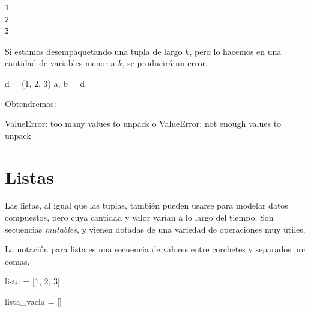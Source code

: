 \documentclass[
  letterpaper,
  DIV=11,
  numbers=noendperiod]{scrreprt}
\newenvironment{Shaded}{\begin{snugshade}}{\end{snugshade}}
\newcommand{\DecValTok}[1]{\textcolor[rgb]{0.68,0.00,0.00}{#1}}
\newcommand{\NormalTok}[1]{\textcolor[rgb]{0.00,0.23,0.31}{#1}}
\newcommand{\OperatorTok}[1]{\textcolor[rgb]{0.37,0.37,0.37}{#1}}
\begin{document}
\begin{verbatim}
1
2
3
\end{verbatim}

\begin{tcolorbox}[enhanced jigsaw, opacitybacktitle=0.6, toptitle=1mm, toprule=.15mm, arc=.35mm, breakable, bottomrule=.15mm, opacityback=0, leftrule=.75mm, rightrule=.15mm, title=\textcolor{quarto-callout-warning-color}{\faExclamationTriangle}\hspace{0.5em}{¡Cuidado!}, left=2mm, bottomtitle=1mm, colframe=quarto-callout-warning-color-frame, colback=white, titlerule=0mm, coltitle=black, colbacktitle=quarto-callout-warning-color!10!white]

Si estamos desempaquetando una tupla de largo \(k\), pero lo hacemos en
una cantidad de variables menor a \(k\), se producirá un error.

\begin{Shaded}
\begin{Highlighting}[]
\NormalTok{d }\OperatorTok{=}\NormalTok{ (}\DecValTok{1}\NormalTok{, }\DecValTok{2}\NormalTok{, }\DecValTok{3}\NormalTok{)}
\NormalTok{a, b }\OperatorTok{=}\NormalTok{ d}
\end{Highlighting}
\end{Shaded}

Obtendremos:

\begin{Shaded}
\begin{Highlighting}[]
\NormalTok{ValueError: too many values to unpack}
\NormalTok{o}
\NormalTok{ValueError: not enough values to unpack}
\end{Highlighting}
\end{Shaded}

\end{tcolorbox}

\section{Listas}\label{listas}

Las listas, al igual que las tuplas, también pueden usarse para modelar
datos compuestos, pero cuya cantidad y valor varían a lo largo del
tiempo. Son secuencias \emph{mutables}, y vienen dotadas de una variedad
de operaciones muy útiles.

La notación para lista es una secuencia de valores entre corchetes y
separados por comas.

\begin{Shaded}
\begin{Highlighting}[]
\NormalTok{lista }\OperatorTok{=}\NormalTok{ [}\DecValTok{1}\NormalTok{, }\DecValTok{2}\NormalTok{, }\DecValTok{3}\NormalTok{]}

\NormalTok{lista\_vacia }\OperatorTok{=}\NormalTok{ []}
\end{Highlighting}
\end{Shaded}
\end{document}
